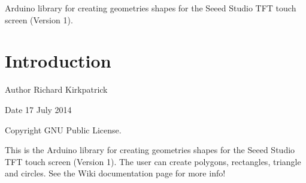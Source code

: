 Arduino library for creating geometries shapes for the Seeed Studio T\+F\+T touch screen (Version 1). \hypertarget{index_intro_sec}{}\section{Introduction}\label{index_intro_sec}
\begin{DoxyAuthor}{Author}
Richard Kirkpatrick 
\end{DoxyAuthor}
\begin{DoxyDate}{Date}
17 July 2014 
\end{DoxyDate}
\begin{DoxyCopyright}{Copyright}
G\+N\+U Public License.
\end{DoxyCopyright}
This is the Arduino library for creating geometries shapes for the Seeed Studio T\+F\+T touch screen (Version 1). The user can create polygons, rectangles, triangle and circles. See the Wiki documentation page for more info! 